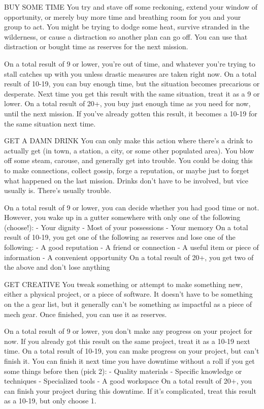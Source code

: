 BUY SOME TIME
You try and stave off some reckoning, extend your window of opportunity, or merely buy more
time and breathing room for you and your group to act. You might be trying to dodge some heat,
survive stranded in the wilderness, or cause a distraction so another plan can go off. You can use
that distraction or bought time as reserves for the next mission.

On a total result of 9 or lower, you’re out of time, and whatever you’re trying to stall catches up
with you unless drastic measures are taken right now.
On a total result of 10-19, you can buy enough time, but the situation becomes precarious or
desperate. Next time you get this result with the same situation, treat it as a 9 or lower.
On a total result of 20+, you buy just enough time as you need for now, until the next mission. If
you’ve already gotten this result, it becomes a 10-19 for the same situation next time.

GET A DAMN DRINK
You can only make this action where there’s a drink to actually get (in town, a station, a city, or
some other populated area). You blow off some steam, carouse, and generally get into trouble.
You could be doing this to make connections, collect gossip, forge a reputation, or maybe just to
forget what happened on the last mission. Drinks don’t have to be involved, but vice usually is.
There’s usually trouble.

On a total result of 9 or lower, you can decide whether you had good time or not. However, you
wake up in a gutter somewhere with only one of the following (choose!):
    -    Your dignity
    -    Most of your possessions
    -    Your memory
On a total result of 10-19, you get one of the following as reserves and lose one of the following:
    -    A good reputation
    -    A friend or connection
    -    A useful item or piece of information
    -    A convenient opportunity
On a total result of 20+, you get two of the above and don’t lose anything

GET CREATIVE
You tweak something or attempt to make something new, either a physical project, or a piece of
software. It doesn’t have to be something on the a gear list, but it generally can’t be something as
impactful as a piece of mech gear. Once finished, you can use it as reserves.




On a total result of 9 or lower, you don’t make any progress on your project for now. If you already
got this result on the same project, treat it as a 10-19 next time.
On a total result of 10-19, you can make progress on your project, but can’t finish it. You can finish
it next time you have downtime without a roll if you get some things before then (pick 2):
    -    Quality materials
    -    Specific knowledge or techniques
    -    Specialized tools
    -    A good workspace
On a total result of 20+, you can finish your project during this downtime. If it’s complicated, treat
this result as a 10-19, but only choose 1.


